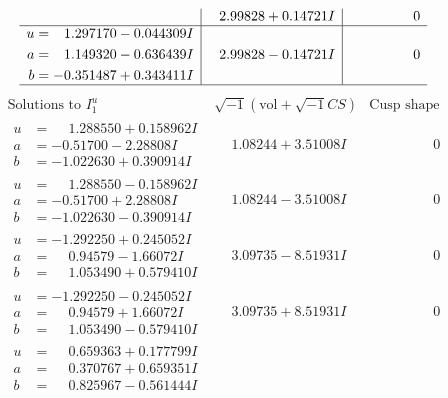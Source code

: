 \documentclass[1p]{elsarticle_modified}
\theoremstyle{definition}
\newcommand{\I}{\sqrt{-1}}
\begin{document}
$$\begin{array}{c|c|c}
 & \phantom{-}2.99828 + 0.14721 I & \phantom{-0.000000 } 0 \\ \hline\begin{aligned}
u &= \phantom{-}1.297170 - 0.044309 I \\
a &= \phantom{-}1.149320 - 0.636439 I \\
b &= -0.351487 + 0.343411 I\end{aligned}
 & \phantom{-}2.99828 - 0.14721 I & \phantom{-0.000000 } 0\\
 \hline 
 \end{array}$$\newpage$$\begin{array}{c|c|c}  
\text{Solutions to }I^u_{1}& \I (\text{vol} + \sqrt{-1}CS) & \text{Cusp shape}\\
 \hline 
\begin{aligned}
u &= \phantom{-}1.288550 + 0.158962 I \\
a &= -0.51700 - 2.28808 I \\
b &= -1.022630 + 0.390914 I\end{aligned}
 & \phantom{-}1.08244 + 3.51008 I & \phantom{-0.000000 } 0 \\ \hline\begin{aligned}
u &= \phantom{-}1.288550 - 0.158962 I \\
a &= -0.51700 + 2.28808 I \\
b &= -1.022630 - 0.390914 I\end{aligned}
 & \phantom{-}1.08244 - 3.51008 I & \phantom{-0.000000 } 0 \\ \hline\begin{aligned}
u &= -1.292250 + 0.245052 I \\
a &= \phantom{-}0.94579 - 1.66072 I \\
b &= \phantom{-}1.053490 + 0.579410 I\end{aligned}
 & \phantom{-}3.09735 - 8.51931 I & \phantom{-0.000000 } 0 \\ \hline\begin{aligned}
u &= -1.292250 - 0.245052 I \\
a &= \phantom{-}0.94579 + 1.66072 I \\
b &= \phantom{-}1.053490 - 0.579410 I\end{aligned}
 & \phantom{-}3.09735 + 8.51931 I & \phantom{-0.000000 } 0 \\ \hline\begin{aligned}
u &= \phantom{-}0.659363 + 0.177799 I \\
a &= \phantom{-}0.370767 + 0.659351 I \\
b &= \phantom{-}0.825967 - 0.561444 I\end{aligned}

\end{array}$$
\end{document}
